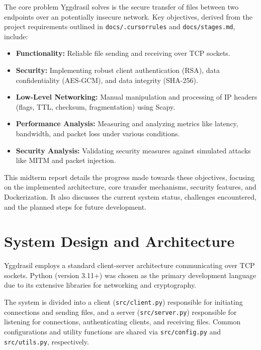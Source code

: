 \documentclass[11pt]{article}
\begin{document}
The core problem Yggdrasil solves is the secure transfer of files between two endpoints over an potentially insecure network. Key objectives, derived from the project requirements outlined in \texttt{docs/.cursorrules} and \texttt{docs/stages.md}, include:
\begin{itemize}
    \item \textbf{Functionality:} Reliable file sending and receiving over TCP sockets.
    \item \textbf{Security:} Implementing robust client authentication (RSA), data confidentiality (AES-GCM), and data integrity (SHA-256).
    \item \textbf{Low-Level Networking:} Manual manipulation and processing of IP headers (flags, TTL, checksum, fragmentation) using Scapy.
    \item \textbf{Performance Analysis:} Measuring and analyzing metrics like latency, bandwidth, and packet loss under various conditions.
    \item \textbf{Security Analysis:} Validating security measures against simulated attacks like MITM and packet injection.
\end{itemize}
This midterm report details the progress made towards these objectives, focusing on the implemented architecture, core transfer mechanisms, security features, and Dockerization. It also discusses the current system status, challenges encountered, and the planned steps for future development.

\section{System Design and Architecture}
\label{sec:design}
Yggdrasil employs a standard client-server architecture communicating over TCP sockets. Python (version 3.11+) was chosen as the primary development language due to its extensive libraries for networking and cryptography.

The system is divided into a client (\texttt{src/client.py}) responsible for initiating connections and sending files, and a server (\texttt{src/server.py}) responsible for listening for connections, authenticating clients, and receiving files. Common configurations and utility functions are shared via \texttt{src/config.py} and \texttt{src/utils.py}, respectively.
\end{document}
